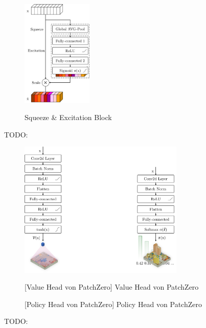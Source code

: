 \begin{figure}
    \centering
    \includegraphics[width=0.3\textwidth]{res/pictures/squeeze-and-excitation-block.pdf}
    \caption[Squeeze \& Excitation Block]{\unskip}
    Squeeze \& Excitation Block
    \label{fig:squeeze-and-excitation-block}
\end{figure}

TODO:

\pagebreak

\begin{figure}[!ht]
    \centering
    \includegraphics[width=0.7\textwidth]{res/pictures/value-and-policy-head.pdf}
    \\
    \begin{minipage}{.49\textwidth}
        \centering
        [Value Head von PatchZero]{\unskip}
        Value Head von PatchZero
        \label{fig:value-head}
    \end{minipage}
    \hfill
    \begin{minipage}{.49\textwidth}
        \centering
        [Policy Head von PatchZero]{\unskip}
        Policy Head von PatchZero
        \label{fig:policy-head}
    \end{minipage}
\end{figure}

TODO: